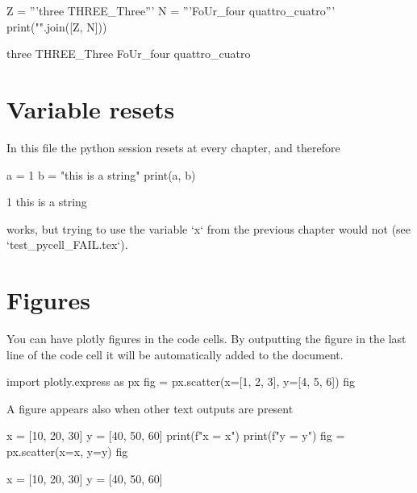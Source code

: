 \documentclass[oneside]{book}
\begin{document}
\begin{pycell}
Z = '''three
THREE_Three'''
N = '''FoUr_four
quattro_cuatro'''
print("\n".join([Z, N]))
\end{pycell}
\begin{pyexpectedoutput}
three
THREE_Three
FoUr_four
quattro_cuatro
\end{pyexpectedoutput}

\chapter{Variable resets}

\begin{mdcell}
In this file the python session resets at every chapter, and therefore
\end{mdcell}

\begin{pycell}
a = 1
b = "this is a string"
print(a, b)
\end{pycell}
\begin{pyexpectedoutput}
1 this is a string
\end{pyexpectedoutput}

\begin{mdcell}
works, but trying to use the variable `x` from the previous chapter would not (see `test_pycell_FAIL.tex`).
\end{mdcell}

\chapter{Figures}

\begin{mdcell}
You can have plotly figures in the code cells. By outputting the figure in the last line of the code cell it will be automatically added to the document.
\end{mdcell}

\begin{pycell}
import plotly.express as px
fig = px.scatter(x=[1, 2, 3], y=[4, 5, 6])
fig
\end{pycell}

\begin{mdcell}
A figure appears also when other text outputs are present
\end{mdcell}

\begin{pycell}
x = [10, 20, 30]
y = [40, 50, 60]
print(f"x = {x}")
print(f"y = {y}")
fig = px.scatter(x=x, y=y)
fig
\end{pycell}
\begin{pyexpectedoutput}
x = [10, 20, 30]
y = [40, 50, 60]
\end{pyexpectedoutput}
\end{document}
